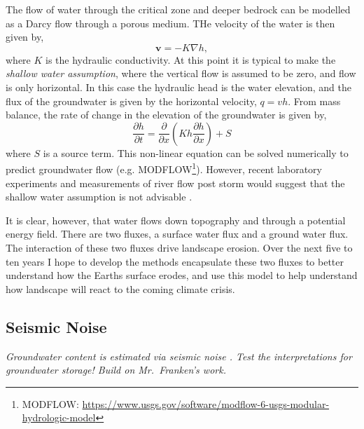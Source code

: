 The flow of water through the critical zone and deeper bedrock can be modelled as a Darcy flow through a porous medium. THe velocity of the water is then given by,
\begin{equation}
\mathbf{v} = -K \nabla h,
\end{equation}
where $K$ is the hydraulic conductivity. At this point it is typical to make the \emph{shallow water assumption}, where the vertical flow is assumed to be zero, and flow is only horizontal. In this case the hydraulic head is the water elevation, and the flux of the groundwater is given by the horizontal velocity, $q = vh$. From mass balance, the rate of change in the elevation of the groundwater is given by,
\begin{equation}
\frac{\partial h}{\partial t} = \frac{\partial}{\partial x} \left( Kh \frac{\partial h}{\partial x} \right) + S
\label{eq:groundwater}
\end{equation}
where $S$ is a source term. This non-linear equation can be solved numerically to predict groundwater flow (e.g. MODFLOW\footnote{MODFLOW: \url{https://www.usgs.gov/software/modflow-6-usgs-modular-hydrologic-model}}). However, recent laboratory experiments and measurements of river flow post storm would suggest that the shallow water assumption is not advisable \citep{guerin-etal-2019}.

It is clear, however, that water flows down topography and through a potential energy field. There are two fluxes, a surface water flux and a ground water flux. The interaction of these two fluxes drive landscape erosion. Over the next five to ten years I hope to develop the methods encapsulate these two fluxes to better understand how the Earths surface erodes, and use this model to help understand how landscape will react to the coming climate crisis.

\subsection{Seismic Noise}

\emph{Groundwater content is estimated via seismic noise \citep{clements-2018}. Test the interpretations for groundwater storage! Build on Mr.~Franken's work.}
